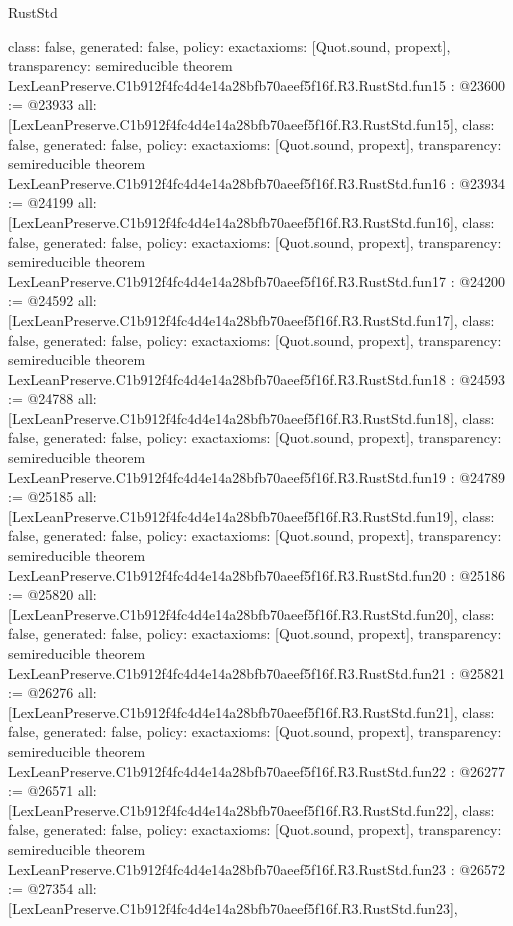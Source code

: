 \begin{lexlean}{RustStd}
\begin{coremodule}
{  class: false,
  generated: false,
  policy: exact{axioms: [Quot.sound, propext]},
  transparency: semireducible
}
theorem LexLeanPreserve.C1b912f4fc4d4e14a28bfb70aeef5f16f.R3.RustStd.fun15 : @23600 := @23933 {
  all: [LexLeanPreserve.C1b912f4fc4d4e14a28bfb70aeef5f16f.R3.RustStd.fun15],
  class: false,
  generated: false,
  policy: exact{axioms: [Quot.sound, propext]},
  transparency: semireducible
}
theorem LexLeanPreserve.C1b912f4fc4d4e14a28bfb70aeef5f16f.R3.RustStd.fun16 : @23934 := @24199 {
  all: [LexLeanPreserve.C1b912f4fc4d4e14a28bfb70aeef5f16f.R3.RustStd.fun16],
  class: false,
  generated: false,
  policy: exact{axioms: [Quot.sound, propext]},
  transparency: semireducible
}
theorem LexLeanPreserve.C1b912f4fc4d4e14a28bfb70aeef5f16f.R3.RustStd.fun17 : @24200 := @24592 {
  all: [LexLeanPreserve.C1b912f4fc4d4e14a28bfb70aeef5f16f.R3.RustStd.fun17],
  class: false,
  generated: false,
  policy: exact{axioms: [Quot.sound, propext]},
  transparency: semireducible
}
theorem LexLeanPreserve.C1b912f4fc4d4e14a28bfb70aeef5f16f.R3.RustStd.fun18 : @24593 := @24788 {
  all: [LexLeanPreserve.C1b912f4fc4d4e14a28bfb70aeef5f16f.R3.RustStd.fun18],
  class: false,
  generated: false,
  policy: exact{axioms: [Quot.sound, propext]},
  transparency: semireducible
}
theorem LexLeanPreserve.C1b912f4fc4d4e14a28bfb70aeef5f16f.R3.RustStd.fun19 : @24789 := @25185 {
  all: [LexLeanPreserve.C1b912f4fc4d4e14a28bfb70aeef5f16f.R3.RustStd.fun19],
  class: false,
  generated: false,
  policy: exact{axioms: [Quot.sound, propext]},
  transparency: semireducible
}
theorem LexLeanPreserve.C1b912f4fc4d4e14a28bfb70aeef5f16f.R3.RustStd.fun20 : @25186 := @25820 {
  all: [LexLeanPreserve.C1b912f4fc4d4e14a28bfb70aeef5f16f.R3.RustStd.fun20],
  class: false,
  generated: false,
  policy: exact{axioms: [Quot.sound, propext]},
  transparency: semireducible
}
theorem LexLeanPreserve.C1b912f4fc4d4e14a28bfb70aeef5f16f.R3.RustStd.fun21 : @25821 := @26276 {
  all: [LexLeanPreserve.C1b912f4fc4d4e14a28bfb70aeef5f16f.R3.RustStd.fun21],
  class: false,
  generated: false,
  policy: exact{axioms: [Quot.sound, propext]},
  transparency: semireducible
}
theorem LexLeanPreserve.C1b912f4fc4d4e14a28bfb70aeef5f16f.R3.RustStd.fun22 : @26277 := @26571 {
  all: [LexLeanPreserve.C1b912f4fc4d4e14a28bfb70aeef5f16f.R3.RustStd.fun22],
  class: false,
  generated: false,
  policy: exact{axioms: [Quot.sound, propext]},
  transparency: semireducible
}
theorem LexLeanPreserve.C1b912f4fc4d4e14a28bfb70aeef5f16f.R3.RustStd.fun23 : @26572 := @27354 {
  all: [LexLeanPreserve.C1b912f4fc4d4e14a28bfb70aeef5f16f.R3.RustStd.fun23],
}
\end{coremodule}
\end{lexlean}
